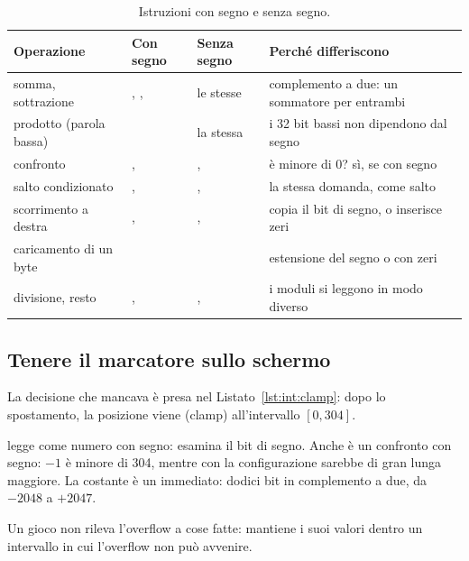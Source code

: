 \begin{table}[htb]
\centering\small
\caption{Istruzioni con segno e senza segno.}\label{tab:int:signed}
\begin{tabularx}{\textwidth}{@{}lllL@{}}
\toprule
\textbf{Operazione} & \textbf{Con segno} & \textbf{Senza segno} & \textbf{Perché differiscono}\\
\midrule
somma, sottrazione & , ,  & le stesse & complemento a due: un sommatore per entrambi\\
prodotto (parola bassa) &  & la stessa & i 32 bit bassi non dipendono dal segno\\
confronto & ,  & ,  &  è minore di 0? sì, se con segno\\
salto condizionato & ,  & ,  & la stessa domanda, come salto\\
scorrimento a destra & ,  & ,  & copia il bit di segno, o inserisce zeri\\
caricamento di un byte &  &  & estensione del segno o con zeri\\
divisione, resto & ,  & ,  & i moduli si leggono in modo diverso\\
\bottomrule
\end{tabularx}
\end{table}

\subsection{Tenere il marcatore sullo schermo}

La decisione che mancava è presa nel Listato~\ref{lst:int:clamp}: dopo lo
spostamento, la posizione viene  (clamp) all'intervallo
$[0, 304]$.


 legge  come numero con segno: esamina il bit di segno. Anche
 è un confronto con segno: $-1$ è minore di 304, mentre con 
la configurazione  sarebbe di gran lunga maggiore. La costante
 è un immediato: dodici bit in complemento a due, da $-2048$ a
$+2047$.

\begin{prgconcept}
Un gioco non rileva l'overflow a cose fatte: mantiene i suoi valori dentro un
intervallo in cui l'overflow non può avvenire.
\end{prgconcept}

